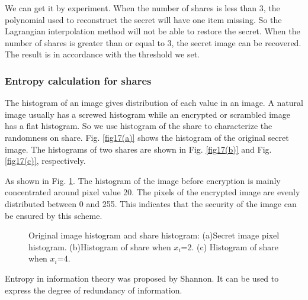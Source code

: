 We can get it by experiment. {\color{red}When the number of shares is less than 3, the polynomial used to reconstruct the secret will have one item missing. So the Lagrangian interpolation method will not be able to restore the secret.} When the number of shares is greater than or equal to 3, the secret image can be recovered. The result is in accordance with the threshold we set.

\subsubsection{Entropy calculation for shares}\label{subsec_Encoding}

The histogram of an image gives distribution of each value in an image. A natural image usually has a screwed histogram while an encrypted or scrambled image has a flat histogram. So we use histogram of the share to characterize the randomness on share. Fig. \ref{fig17(a)} shows the histogram of the original secret image. The histograms of two shares are shown in Fig. \ref{fig17(b)} and Fig. \ref{fig17(c)}, respectively. 

As shown in Fig. \ref{fig17}. The histogram of the image before encryption is mainly concentrated around pixel value 20. The pixels of the encrypted image are evenly distributed between 0 and 255. This indicates that the security of the image can be ensured by this scheme.

\begin{figure}[!htb]
	\centering

	\centering
	\caption{Original image histogram and share histogram: (a)Secret image pixel histogram. (b)Histogram of share when $x_{i}$=2. (c) Histogram of share when $x_{i}$=4.}
	\label{fig17}
\end{figure}

Entropy in information theory was proposed by Shannon. It can be used to express the degree of redundancy of information.

